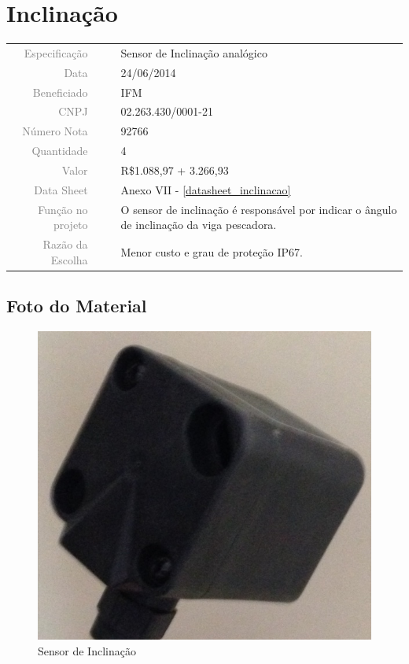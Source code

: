 

\section{Inclinação}
\label{inclinacao}

 
\begin{table}[ht!]

	\begin{tabular}{r l|l p{12cm} }
		
		\textcolor{gray}{Especificação} &&& 	{Sensor de Inclinação analógico }\\
		\textcolor{gray}{Data} &&& 				{24/06/2014}\\
        \textcolor{gray}{Beneficiado} &&&		{IFM} \\
        \textcolor{gray}{CNPJ} &&& 				{02.263.430/0001-21} \\
        \textcolor{gray}{Número Nota} &&& 		{92766} \\
		\textcolor{gray}{Quantidade} &&& 		{4} \\
		\textcolor{gray}{Valor} &&& 			{R\$1.088,97 + 3.266,93} \\
		\textcolor{gray}{Data Sheet} &&& 		{Anexo VII - \ref{datasheet_inclinacao} }
		\\

		\textcolor{gray}{Função no projeto} &&& {O sensor de inclinação é responsável
		por indicar o ângulo de inclinação da viga pescadora.}
		\\
		\textcolor{gray}{Razão da Escolha} &&& {Menor custo e grau de proteção IP67.}
		\end{tabular}
\end{table}

\newpage
\subsection{Foto do Material}
\begin{figure}[H]
 \centering
 \includegraphics[width=1\columnwidth]{Inclinacao/foto.jpg}
 \caption{Sensor de Inclinação}  
\end{figure}


